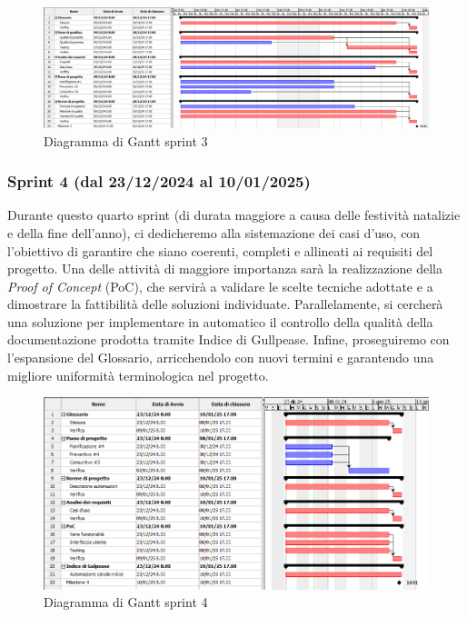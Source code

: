         \begin{figure}[h!]
            \centering
            \includegraphics[scale = 0.3]{template/images/gantt3.png}
            \caption{Diagramma di Gantt sprint 3}
            \label{fig:3.3} %
        \end{figure}

        \subsubsection{Sprint 4 (dal 23/12/2024 al 10/01/2025)}
        Durante questo quarto sprint (di durata maggiore a causa delle festività natalizie e della fine dell'anno), ci dedicheremo alla sistemazione dei casi d'uso, con l'obiettivo di garantire che siano coerenti, completi e allineati ai requisiti del progetto. 
        Una delle attività di maggiore importanza sarà la realizzazione della \textit{Proof of Concept} (PoC), che servirà a validare le scelte tecniche adottate e a dimostrare la fattibilità delle soluzioni individuate. 
        Parallelamente, si cercherà una soluzione per implementare in automatico il controllo della qualità della documentazione prodotta tramite Indice di Gullpease. 
        Infine, proseguiremo con l'espansione del Glossario, arricchendolo con nuovi termini e garantendo una migliore uniformità terminologica nel progetto.

        \begin{figure}[h!]
            \centering
            \includegraphics[scale = 0.3]{template/images/gantt4.png}
            \caption{Diagramma di Gantt sprint 4}
            \label{fig:3.4} %
        \end{figure}

 
